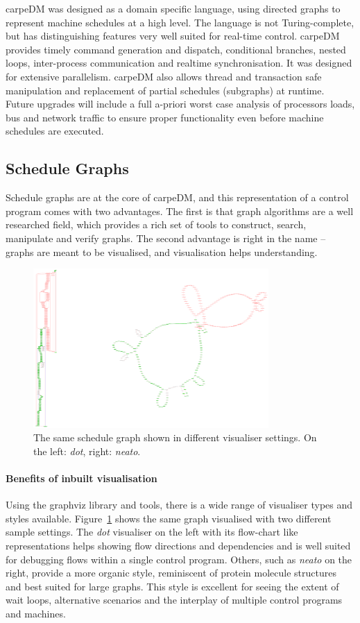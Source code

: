 carpeDM was designed as a domain specific language, using directed graphs to represent machine schedules at a high level. The language is not Turing-complete, but has distinguishing features very well suited for real-time control. carpeDM provides timely command generation and dispatch, conditional branches, nested loops, inter-process communication and realtime synchronisation. It was designed for extensive parallelism.
carpeDM also allows thread and transaction safe manipulation and replacement of partial schedules (subgraphs) at runtime. Future upgrades will include a full a-priori worst case analysis of processors loads, bus and network traffic to ensure
proper functionality even before machine schedules are executed.

\subsection{Schedule Graphs}
Schedule graphs are at the core of carpeDM, and this representation of a control program comes with two advantages. The first is that graph algorithms are a well researched field, which provides a rich set of tools to construct, search, manipulate and 
verify graphs. The second advantage is right in the name -- graphs are meant to be visualised, and visualisation helps understanding. 
\begin{figure}[H]
   \centering
   \includegraphics*[width=0.8\textwidth,keepaspectratio]{Figures/vis_dot_vs_neato}
   \caption{The same schedule graph shown in different visualiser settings. On the left: \emph{dot}, right: \emph{neato}. %
    }
   \label{fig:dot_vs_neato}
\end{figure}
\paragraph{Benefits of inbuilt visualisation}
Using the graphviz library and tools, there is a wide range of visualiser types and styles available. Figure~\ref{fig:dot_vs_neato} shows the same graph visualised with two different sample settings. The \emph{dot} visualiser on the left with its flow-chart like representations helps showing flow directions and dependencies and is well suited for debugging flows within a single control program. Others, such as \emph{neato} on the right, provide a more organic style, reminiscent of protein molecule structures and best suited for large graphs. This style is excellent for seeing the extent of wait loops, alternative scenarios and the interplay of multiple control programs and machines.
